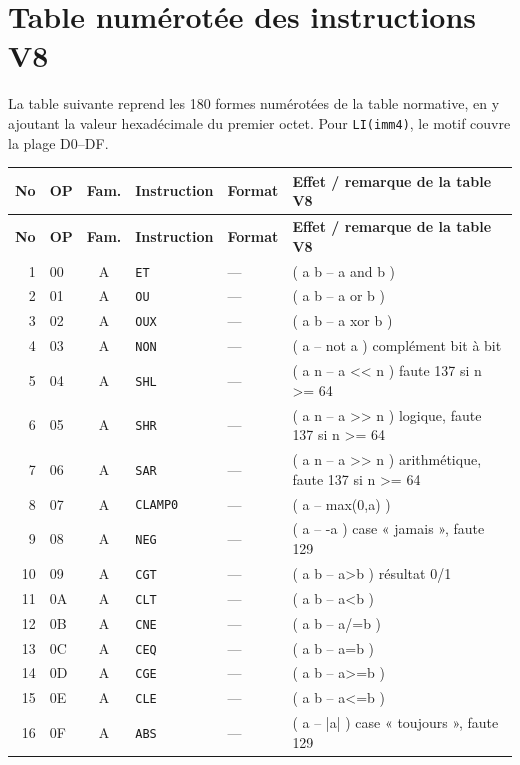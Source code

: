 \documentclass[10pt,a4paper,twoside,openany]{book}
\begin{document}
\chapter{Table numérotée des instructions V8}
La table suivante reprend les 180 formes numérotées de la table normative, en y ajoutant la valeur hexadécimale du premier octet. Pour \texttt{LI(imm4)}, le motif couvre la plage D0--DF.
\begin{landscape}
\scriptsize
\setlength{\LTleft}{0pt}\setlength{\LTright}{0pt}
\begin{longtable}{@{}r l c l l p{10.7cm}@{}}
\toprule
\textbf{No} & \textbf{OP} & \textbf{Fam.} & \textbf{Instruction} & \textbf{Format} & \textbf{Effet / remarque de la table V8}\\ \midrule
\endfirsthead
\toprule
\textbf{No} & \textbf{OP} & \textbf{Fam.} & \textbf{Instruction} & \textbf{Format} & \textbf{Effet / remarque de la table V8}\\ \midrule
\endhead
1 & 00 & A & \texttt{ET} & --- & ( a b -- a and b )\\
2 & 01 & A & \texttt{OU} & --- & ( a b -- a or b )\\
3 & 02 & A & \texttt{OUX} & --- & ( a b -- a xor b )\\
4 & 03 & A & \texttt{NON} & --- & ( a -- not a )	complément bit à bit\\
5 & 04 & A & \texttt{SHL} & --- & ( a n -- a << n )	faute 137 si n >= 64\\
6 & 05 & A & \texttt{SHR} & --- & ( a n -- a >> n )	logique, faute 137 si n >= 64\\
7 & 06 & A & \texttt{SAR} & --- & ( a n -- a >> n )	arithmétique, faute 137 si n >= 64\\
8 & 07 & A & \texttt{CLAMP0} & --- & ( a -- max(0,a) )\\
9 & 08 & A & \texttt{NEG} & --- & ( a -- -a )		case « jamais », faute 129\\
10 & 09 & A & \texttt{CGT} & --- & ( a b -- a>b )	résultat 0/1\\
11 & 0A & A & \texttt{CLT} & --- & ( a b -- a<b )\\
12 & 0B & A & \texttt{CNE} & --- & ( a b -- a/=b )\\
13 & 0C & A & \texttt{CEQ} & --- & ( a b -- a=b )\\
14 & 0D & A & \texttt{CGE} & --- & ( a b -- a>=b )\\
15 & 0E & A & \texttt{CLE} & --- & ( a b -- a<=b )\\
16 & 0F & A & \texttt{ABS} & --- & ( a -- |a| )		case « toujours », faute 129\\

\end{longtable}
\end{landscape}
\end{document}
